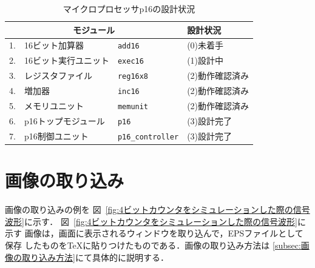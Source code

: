 \documentclass{jarticle}[11pt]
\begin{document}
\begin{table}[htb]
\caption{マイクロプロセッサp16の設計状況}
\label{tab:マイクロプロセッサp16の設計状況}
\begin{center}
{\small
\begin{tabular}{rll|l}
\hline
\hline
\multicolumn{3}{c|}{モジュール} & 設計状況 \\
\hline
1. & 16ビット加算器       & \verb|add16|          & (0)未着手 \\
2. & 16ビット実行ユニット & \verb|exec16|         & (1)設計中 \\
3. & レジスタファイル     & \verb|reg16x8|        & (2)動作確認済み \\
4. & 増加器               & \verb|inc16|          & (2)動作確認済み \\
5. & メモリユニット       & \verb|memunit|        & (2)動作確認済み \\
6. & p16トップモジュール  & \verb|p16|            & (3)設計完了 \\
7. & p16制御ユニット      & \verb|p16_controller| & (3)設計完了 \\
\hline
\end{tabular}
}
\end{center}
\end{table}

\section{画像の取り込み}
画像の取り込みの例を
図~\ref{fig:4ビットカウンタをシミュレーションした際の信号波形}に示す．
図~\ref{fig:4ビットカウンタをシミュレーションした際の信号波形}に示す
画像は，画面に表示されるウィンドウを取り込んで，EPSファイルとして保存
したものをTeXに貼りつけたものである．画像の取り込み方法は
\ref{subsec:画像の取り込み方法}にて具体的に説明する．
\end{document}
